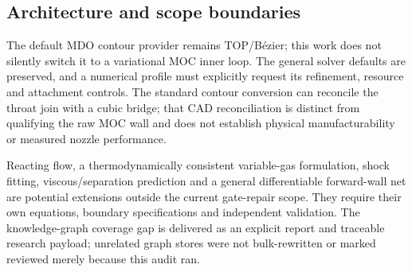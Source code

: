 \subsection{Architecture and scope boundaries}
The default MDO contour provider remains TOP/B\'ezier; this work does not
silently switch it to a variational MOC inner loop. The general solver defaults
are preserved, and a numerical profile must explicitly request its refinement,
resource and attachment controls. The standard contour conversion can reconcile
the throat join with a cubic bridge; that CAD reconciliation is distinct from
qualifying the raw MOC wall and does not establish physical manufacturability
or measured nozzle performance.

Reacting flow, a thermodynamically consistent variable-gas formulation,
shock fitting, viscous/separation prediction and a general differentiable
forward-wall net are potential extensions outside the current gate-repair
scope. They require their own equations, boundary specifications and independent
validation. The knowledge-graph coverage gap is delivered as an explicit report
and traceable research payload; unrelated graph stores were not bulk-rewritten
or marked reviewed merely because this audit ran.
